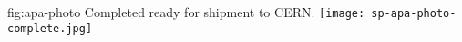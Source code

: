 \begin{dunefigure}{fig:apa-photo}
{Completed   ready for shipment to CERN.}
\texttt{[image: sp-apa-photo-complete.jpg]}
\end{dunefigure}
